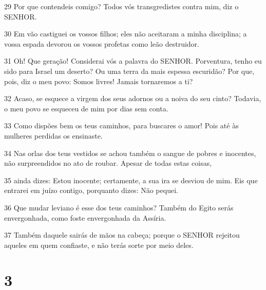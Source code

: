 \par 29 Por que contendeis comigo? Todos vós transgredistes contra mim, diz o SENHOR.
\par 30 Em vão castiguei os vossos filhos; eles não aceitaram a minha disciplina; a vossa espada devorou os vossos profetas como leão destruidor.
\par 31 Oh! Que geração! Considerai vós a palavra do SENHOR. Porventura, tenho eu sido para Israel um deserto? Ou uma terra da mais espessa escuridão? Por que, pois, diz o meu povo: Somos livres! Jamais tornaremos a ti?
\par 32 Acaso, se esquece a virgem dos seus adornos ou a noiva do seu cinto? Todavia, o meu povo se esqueceu de mim por dias sem conta.
\par 33 Como dispões bem os teus caminhos, para buscares o amor! Pois até às mulheres perdidas os ensinaste.
\par 34 Nas orlas dos teus vestidos se achou também o sangue de pobres e inocentes, não surpreendidos no ato de roubar. Apesar de todas estas coisas,
\par 35 ainda dizes: Estou inocente; certamente, a sua ira se desviou de mim. Eis que entrarei em juízo contigo, porquanto dizes: Não pequei.
\par 36 Que mudar leviano é esse dos teus caminhos? Também do Egito serás envergonhada, como foste envergonhada da Assíria.
\par 37 Também daquele sairás de mãos na cabeça; porque o SENHOR rejeitou aqueles em quem confiaste, e não terás sorte por meio deles.

\chapter{3}

